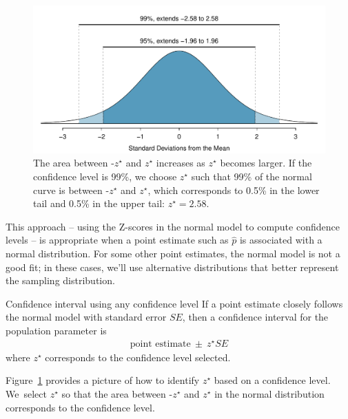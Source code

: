 \begin{figure}
  \centering
  \includegraphics[width=\textwidth]{ch_foundations_for_inf/figures/choosingZForCI/choosingZForCI}
  \caption{The area between -$z^{\star}$ and $z^{\star}$ increases as
      $z^{\star}$ becomes larger. If the confidence level is 99\%,
      we choose $z^{\star}$ such that 99\% of the normal curve is
      between -$z^{\star}$ and $z^{\star}$, which corresponds to 0.5\%
      in the lower tail and 0.5\% in the upper tail: $z^{\star}=2.58$.}
\label{choosingZForCI}
\end{figure}

This approach -- using the Z-scores in the
normal model to compute confidence levels --
is appropriate when a point estimate such as $\hat{p}$
is associated with a normal distribution.
For some other point estimates, the normal model is not a good fit;
in these cases, we'll use alternative distributions that better
represent the sampling distribution.

\begin{onebox}{Confidence interval using any confidence level}
  If a point estimate closely follows the normal model
  with standard error $SE$, then a confidence interval
  for the population parameter is
  \begin{align*}
  \text{point estimate}\ \pm\ z^{\star} SE
  \end{align*}
  where $z^{\star}$ corresponds to the confidence
  level selected.
\end{onebox}

Figure~\ref{choosingZForCI} provides a picture of how to identify
$z^{\star}$ based on a confidence level. We~select $z^{\star}$
so that the area between -$z^{\star}$ and $z^{\star}$ in the normal
distribution corresponds to the confidence level. 

